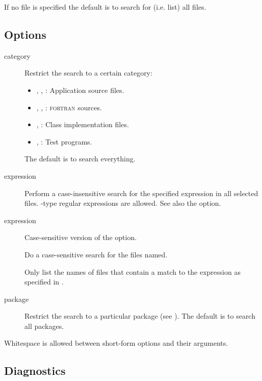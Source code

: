 If no file is specified the default is to search for (i.e. list) all files.

\subsection*{Options}

\begin{description}
\item[ category]
   Restrict the search to a certain category:
   \begin{itemize}
      \item
      , , : Application source files.

      \item
      , , : \textsc{fortran} sources.

      \item
      , : Class implementation files.

      \item
      , : Test programs.
   \end{itemize}
   The default is to search everything.

\item[ expression]
   Perform a case-insensitive search for the specified expression in all
   selected files.  -type regular expressions are allowed.
   See also the  option.

\item[ expression]
   Case-sensitive version of the  option.

\item[]
   Do a case-sensitive search for the files named.

\item[]
   Only list the names of files that contain a match to the expression 
   as specified in .

\item[ package]
   Restrict the search to a particular package (see ).
   The default is to search all packages.
\end{description}

\noindent
Whitespace is allowed between short-form options and their arguments.

\subsection*{Diagnostics}

